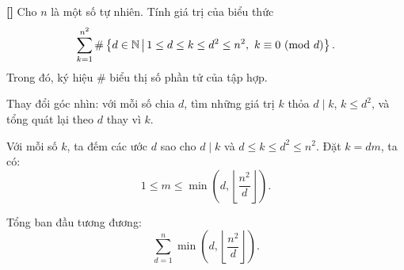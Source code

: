 \documentclass[../01-divisibility.tex]{subfiles}
\begin{document}
\begin{exercise*}\label{example:ROU-2014-MO-G10-P1}\textbf{[]}
    Cho \( n \) là một số tự nhiên. Tính giá trị của biểu thức
    \[
        \sum_{k=1}^{n^2} \#\left\{ d \in \mathbb{N} \,\middle|\, 1 \le d \le k \le d^2 \le n^2,\ k \equiv 0 \ (\mathrm{mod}\ d) \right\}.
    \]
    Trong đó, ký hiệu \( \# \) biểu thị số phần tử của tập hợp.
\end{exercise*}

\begin{remark*}
    Thay đổi góc nhìn: với mỗi số chia \( d \), tìm những giá trị \( k \) thỏa \( d \mid k \), \( k \le d^2 \), và tổng quát lại theo \( d \) thay vì \( k \).
\end{remark*}

\begin{story*}
    Với mỗi số \( k \), ta đếm các ước \( d \) sao cho \( d \mid k \) và \( d \le k \le d^2 \le n^2 \). Đặt \( k = dm \), ta có:
    \[
        1 \le m \le \min\left(d, \left\lfloor \frac{n^2}{d} \right\rfloor\right).
    \]
    
    Tổng ban đầu tương đương:
    \[
        \sum_{d=1}^{n} \min\left(d, \left\lfloor \frac{n^2}{d} \right\rfloor\right).
    \]
\end{story*}
\end{document}

